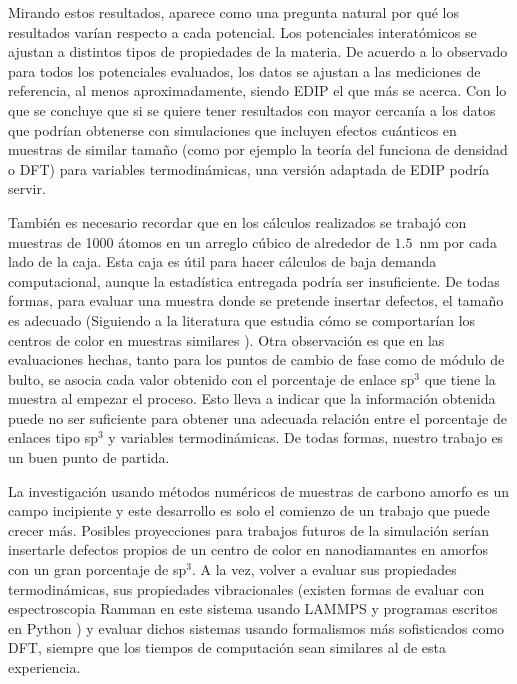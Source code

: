 \documentclass[aps,prl,twocolumn,superscriptaddress,groupedaddress]{revtex4}
\begin{document}
Mirando estos resultados, aparece como una pregunta natural por qué los resultados varían respecto a cada potencial. Los potenciales interatómicos se ajustan a distintos tipos de propiedades de la materia.  De acuerdo a lo observado para todos los potenciales evaluados, los datos se ajustan a las mediciones de referencia, al menos aproximadamente, siendo EDIP el que más se acerca. Con lo que se concluye que si se quiere tener resultados con mayor cercanía a los datos que podrían obtenerse con  simulaciones que incluyen efectos cuánticos en muestras de similar tamaño (como por ejemplo la teoría del funciona de densidad o DFT) para variables termodinámicas, una versión adaptada de EDIP podría servir.  

También es necesario recordar que en los cálculos realizados se  trabajó con muestras de 1000 átomos en un arreglo cúbico de alrededor de $1.5$~nm por cada lado de la caja. Esta caja es útil para hacer cálculos de baja demanda computacional, aunque la estadística entregada podría ser insuficiente.  De todas formas, para evaluar una muestra donde se pretende insertar defectos, el tamaño es adecuado (Siguiendo a la literatura que estudia cómo se comportarían los centros de color en muestras similares \cite{NVDiamond}). Otra observación es que en las evaluaciones hechas, tanto para los puntos de cambio de fase como de módulo de bulto, se asocia cada valor obtenido con el porcentaje de enlace sp$^3$ que tiene la muestra al empezar el proceso. Esto lleva a indicar que la información obtenida puede no ser suficiente para obtener una adecuada relación entre el porcentaje de enlaces tipo sp$^3$ y variables termodinámicas. De todas formas, nuestro trabajo es  un buen punto de partida.

La investigación usando métodos numéricos de muestras de carbono amorfo es un campo incipiente y este desarrollo es solo el comienzo de un trabajo que puede crecer más. Posibles proyecciones para trabajos futuros de la simulación serían insertarle defectos propios de un centro de color en nanodiamantes en amorfos con un gran porcentaje de sp$^3$. A la vez, volver a evaluar sus propiedades termodinámicas, sus propiedades vibracionales (existen formas de evaluar con espectroscopia Ramman en este sistema usando LAMMPS y programas  escritos en Python \cite{Phonopy}) y evaluar dichos sistemas usando formalismos más sofisticados como DFT, siempre que los tiempos de computación sean similares al de esta experiencia.\\ 
\end{document}
